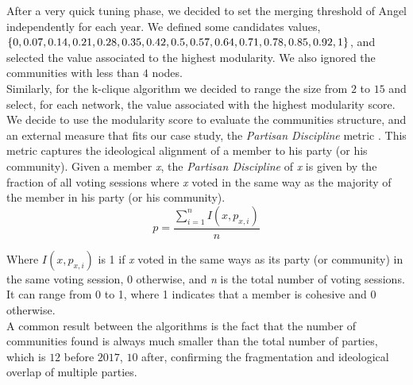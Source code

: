 After a very quick tuning phase, we decided to set the merging threshold of Angel independently for each year. We defined some candidates values, $\{0, 0.07, 0.14, 0.21, 0.28, 0.35,\\ 0.42, 0.5, 0.57, 0.64, 0.71, 0.78, 0.85, 0.92, 1\}$, and selected the value associated to the highest modularity. We also ignored the communities with less than $4$ nodes. \\

Similarly, for the k-clique algorithm we decided to range the size from $2$ to $15$ and select, for each network, the value associated with the highest modularity score.\\

We decide to use the modularity score to evaluate the communities structure, and an external measure that fits our case study, the \textit{Partisan Discipline} metric \cite{PD}.
 This metric captures the ideological alignment of a member to his party (or his community). Given a member \textit{x}, the \textit{Partisan Discipline} of \textit{x} is given by the fraction of all voting sessions where \textit{x} voted in the same way as the majority of the member in his party (or his community). 
\begin{equation}
    p = \dfrac{\sum_{i = 1}^{n}{I(x, p_{x,i})}} {n}
\end{equation}

\noindent Where $I(x, p_{x,i})$ is 1 if \textit{x} voted in the same ways as its party (or community) in the same voting session, $0$ otherwise, and \textit{n} is the total number of voting sessions.
 It can range from 0 to 1, where 1 indicates that a member is cohesive and 0 otherwise.\\

A common result between the algorithms is the fact that the number of communities found is always much smaller than the total number of parties, which is $12$ before $2017$, $10$ after, confirming the fragmentation and ideological overlap of multiple parties.\\

